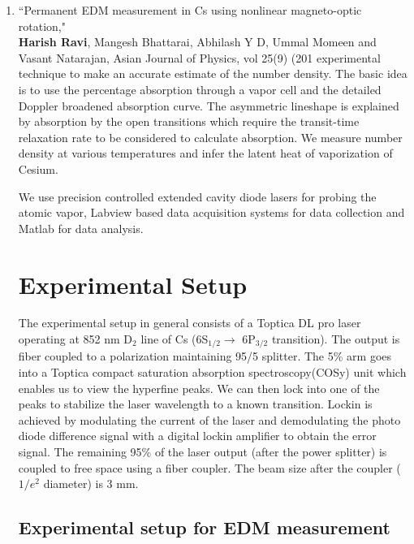 \publications

\begin{enumerate}
\item ``Permanent EDM measurement in Cs using nonlinear magneto-optic rotation," \\
\textbf{Harish Ravi}, Mangesh Bhattarai, Abhilash Y D, Ummal Momeen and Vasant Natarajan, Asian Journal of Physics, vol 25(9) (201 experimental technique to make an accurate estimate of the number density. The basic idea is to use the percentage absorption through a vapor cell and the detailed Doppler broadened absorption curve. The asymmetric lineshape is explained by absorption by the open transitions which require the transit-time relaxation rate to be considered to calculate absorption. We measure number density at various temperatures and infer the latent heat of vaporization of Cesium.

We use precision controlled extended cavity diode lasers for probing the atomic vapor, Labview based data acquisition systems for data collection and Matlab for data analysis.


\chapter{Experimental Setup}

The experimental setup in general consists of a Toptica DL pro laser operating at 852 nm D$_2$ line of Cs (6S$_{1/2} \rightarrow $ 6P$_{3/2}$ transition). The output is fiber coupled to a polarization maintaining 95/5 splitter. The 5\% arm goes into a Toptica compact saturation absorption spectroscopy(COSy) unit which enables us to view the hyperfine peaks. We can then lock into one of the peaks to stabilize the laser wavelength to a known transition. Lockin is achieved by modulating the current of the laser and demodulating the photo diode difference signal with a digital lockin amplifier to obtain the error signal. The remaining 95\% of the laser output (after the power splitter) is coupled to free space using a fiber coupler. The beam size after the coupler ($1/e^2$ diameter) is 3 mm.

\section{Experimental setup for EDM measurement}


\end{enumerate}
